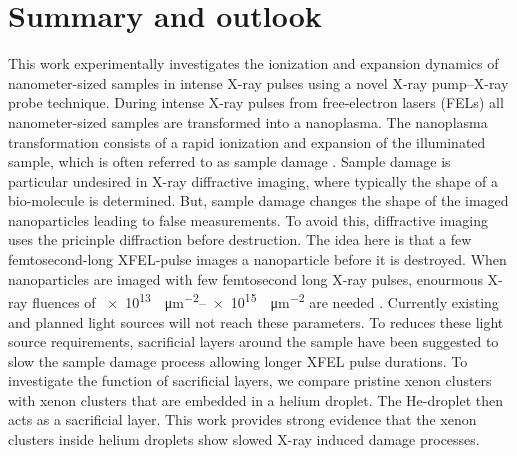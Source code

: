 \chapter{Summary and outlook}\label{ch:summary_outlook}
%
This work experimentally investigates the ionization and expansion dynamics of nanometer-sized samples in intense X-ray pulses using a novel X-ray pump--X-ray probe technique. During intense X-ray pulses from free-electron lasers (FELs) all nanometer-sized samples are transformed into a nanoplasma. The nanoplasma transformation consists of a rapid ionization and expansion of the illuminated sample, which is often referred to as sample damage \cite{Neutze-2000-Nature,Arbeiter-2011-NJP}. Sample damage is particular undesired in X-ray diffractive imaging, where typically the shape of a bio-molecule is determined. But, sample damage changes the shape of the imaged nanoparticles leading to false measurements. To avoid this, diffractive imaging uses the pricinple diffraction before destruction. The idea here is that a few femtosecond-long XFEL-pulse images a nanoparticle before it is destroyed. When nanoparticles are imaged with few femtosecond long X-ray pulses, enourmous X-ray fluences of \SIrange{e13}{e15}{\photons\per\square\micro\meter} are needed \citep{Hau-Riege-2005-PRE}. Currently existing and planned light sources will not reach these parameters. To reduces these light source requirements, sacrificial layers around the sample have been suggested to slow the sample damage process \cite{Hau-Riege-2007-PRL,Hau-Riege-2010-PRL} allowing longer XFEL pulse durations. To investigate the function of sacrificial layers, we compare pristine xenon clusters with xenon clusters that are embedded in a helium droplet. The He-droplet then acts as a sacrificial layer. This work provides strong evidence that the xenon clusters inside helium droplets show slowed X-ray induced damage processes.\\[1\baselineskip]
%
